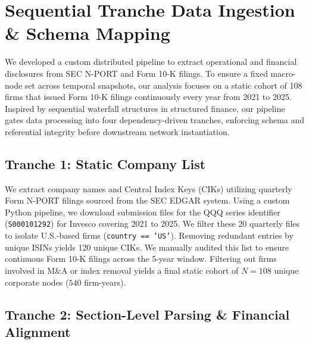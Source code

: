 \section{Sequential Tranche Data Ingestion \& Schema Mapping}
\label{sec:extraction}

We developed a custom distributed pipeline to extract operational and financial disclosures from SEC N-PORT and Form 10-K filings. To ensure a fixed macro-node set across temporal snapshots, our analysis focuses on a static cohort of 108 firms that issued Form 10-K filings continuously every year from 2021 to 2025. Inspired by sequential waterfall structures in structured finance, our pipeline gates data processing into four dependency-driven tranches, enforcing schema and referential integrity before downstream network instantiation.



\subsection{Tranche 1: Static Company List}
We extract company names and Central Index Keys (CIKs) utilizing quarterly Form N-PORT filings sourced from the SEC EDGAR system. Using a custom Python pipeline, we download submission files for the QQQ series identifier (\texttt{S000101292}) for Invesco covering 2021 to 2025. We filter these 20 quarterly files to isolate U.S.-based firms (\texttt{country == 'US'}). Removing redundant entries by unique ISINs yields 120 unique CIKs. We manually audited this list to ensure continuous Form 10-K filings across the 5-year window. Filtering out firms involved in M\&A or index removal yields a final static cohort of $N = 108$ unique corporate nodes ($540$ firm-years).

\subsection{Tranche 2: Section-Level Parsing \& Financial Alignment}


